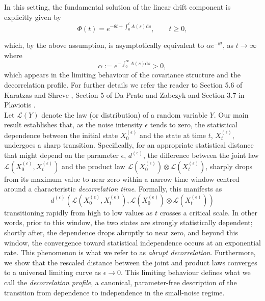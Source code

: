 \documentclass[12pt,thmsa]{article}
\newcommand{\ud}{\mathrm{d}}
\begin{document}
In this setting, the fundamental solution of the  linear drift component is explicitly given by
\begin{equation}\label{eq:linear1}
\Phi(t)=e^{-\theta t+\int_0^t A(s)\ud s}, \qquad t\ge0,	
\end{equation}

which, by the above  assumption, is asymptotically equivalent to $\alpha e^{-\theta t}$, as $t\to \infty$ where
\[
\alpha:=e^{-\int_0^\infty A(s)\ud s}>0,
\]
which appears in the limiting behaviour of the covariance structure and the decorrelation profile. For further details we refer  the reader to Section 5.6 of Karatzas and Shreve \cite{KS91}, Section 5 of Da Prato and Zabczyk \cite{DPZAB} and Section 3.7 in Plaviotis \cite{Pav}.\\

Let $\mathcal{L}(Y)$ denote the law (or distribution) of a random variable $Y$. Our main result establishes that, as the noise intensity  $\epsilon$ tends to zero, the statistical dependence between the initial state $X_0^{(\epsilon)}$ and the state at time $t$, $X_t^{(\epsilon)}$, undergoes a sharp transition. Specifically, for an appropriate statistical distance that might depend on the parameter $\epsilon$, $d^{(\epsilon)}$, the difference between the joint  law  $\mathcal{L}(X_0^{(\epsilon)}, X_t^{(\epsilon)})$ and the product law $\mathcal{L}(X_0^{(\epsilon)})\otimes\mathcal{L}(X_t^{(\epsilon)})$,  sharply drops from its maximum  value to near zero within a narrow time window centred around a characteristic {\it decorrelation  time}.  Formally, this manifests as
\[
d^{(\epsilon)}\left( \mathcal{L}(X_0^{(\epsilon)}, X_t^{(\epsilon)}), \mathcal{L}(X_0^{(\epsilon)})\otimes\mathcal{L}(X_t^{(\epsilon)})\right)
\]
transitioning rapidly from high to low values as $t$ crosses a critical scale. In other words, prior to this window, the two states are strongly statistically dependent; shortly after, the dependence drops abruptly to near zero, and beyond this window, the convergence toward statistical independence occurs at an exponential rate. This phenomenon is what we refer to as  {\it abrupt decorrelation}. Furthermore, we show that the rescaled distance between the joint and product laws converges to a universal limiting curve as $\epsilon \to 0$. This limiting behaviour defines what we call the {\it decorrelation profile}, a canonical, parameter-free description of the transition from dependence to independence in the small-noise regime.
\end{document}
